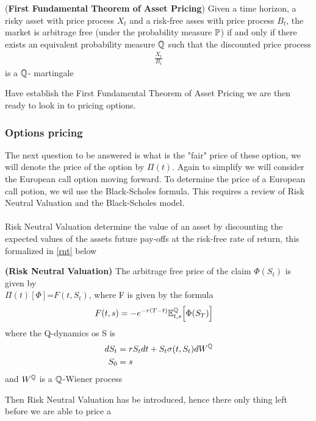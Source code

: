 \begin{theorem}
    (\textbf{First Fundamental Theorem of Asset Pricing})
    Given a time horizon, a risky asset with price process $X_t$ and a
    risk-free asses with price process $B_t$, the market is arbitrage free 
    (under the probability measure $\mathbb{P}$) if and only if there exists an 
    equivalent probability measure $\mathbb{Q}$ such that the discounted price process
    \begin{align*}
        \frac{X_t}{B_t}
    \end{align*}
    is a $\mathbb{Q}$- martingale \cite{Bjork}
    \label{frist_theorem_of_asset_pricing}
\end{theorem}
\noindent 
Have establish the First Fundamental Theorem of Asset Pricing we are then ready to look in to pricing options.
\subsubsection{Options pricing}
The next question to be answered is what is the "fair" price of these option, we will denote the price of
the option by $\Pi(t)$. Again to simplify we will consider
the European call option moving forward. To determine the price of a European call potion, we wil use the 
Black-Scholes formula. This requires a review of Risk Neutral Valuation and the Black-Scholes model.
\\\\
Risk Neutral Valuation determine the value of an asset by discounting the expected values of the assets future 
pay-offs at the risk-free rate of return, this formalized in \autoref{rnt} below
\begin{theorem}
    \textbf{(Risk Neutral Valuation)} The arbitrage free price of the claim $\Phi(S_t)$ is given by \\
    $\Pi(t)[\Phi]$=$F(t,S_t)$, where F is given by the formula 
    \begin{align*}
        F(t,s) &= -e^{-r(T-t)} \mathbb{E}_{t,s}^{\mathbb{Q}} \Big[\Phi(S_T)\Big]
    \end{align*}
    where the Q-dynamics os S is
    \begin{align*}
        dS_t & = r S_t dt + S_t \sigma(t,S_t) dW^{\mathbb{Q}} \\
        S_0 & = s
    \end{align*}
    and $W^{\mathbb{Q}}$ is a $\mathbb{Q}$-Wiener process \cite{Bjork}
    \label{rnt}
\end{theorem}
\noindent 
Then Risk Neutral Valuation has be introduced, hence there only thing left before we are able to price a 

